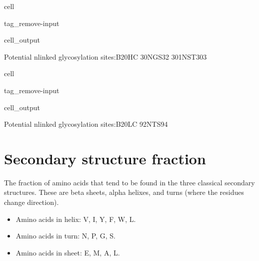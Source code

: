 \documentclass[letterpaper,10pt,english]{jupyterBook}
\begin{document}
\begin{sphinxuseclass}{cell}
\begin{sphinxuseclass}{tag_remove-input}\begin{sphinxVerbatimOutput}

\begin{sphinxuseclass}{cell_output}
\begin{sphinxVerbatim}[commandchars=\\\{\}]
Potential n\PYGZhy{}linked glycosylation sites:\PYGZhy{}\PYGZhy{}\PYGZhy{}\PYGZhy{}\PYGZhy{}\PYGZhy{}\PYGZhy{}\PYGZhy{}\PYGZhy{}\PYGZhy{}\PYGZhy{}\PYGZhy{}\PYGZhy{}\PYGZhy{}B20\PYGZus{}HC
30\PYGZhy{}NGS\PYGZhy{}32
301\PYGZhy{}NST\PYGZhy{}303
\end{sphinxVerbatim}

\end{sphinxuseclass}\end{sphinxVerbatimOutput}

\end{sphinxuseclass}
\end{sphinxuseclass}
\begin{sphinxuseclass}{cell}
\begin{sphinxuseclass}{tag_remove-input}\begin{sphinxVerbatimOutput}

\begin{sphinxuseclass}{cell_output}
\begin{sphinxVerbatim}[commandchars=\\\{\}]
Potential n\PYGZhy{}linked glycosylation sites:\PYGZhy{}\PYGZhy{}\PYGZhy{}\PYGZhy{}\PYGZhy{}\PYGZhy{}\PYGZhy{}\PYGZhy{}\PYGZhy{}\PYGZhy{}\PYGZhy{}\PYGZhy{}\PYGZhy{}\PYGZhy{}B20\PYGZus{}LC
92\PYGZhy{}NTS\PYGZhy{}94
\end{sphinxVerbatim}

\end{sphinxuseclass}\end{sphinxVerbatimOutput}

\end{sphinxuseclass}
\end{sphinxuseclass}

\section{Secondary structure fraction}
\label{\detokenize{ipynb/chapter1:secondary-structure-fraction}}
\sphinxAtStartPar
The fraction of amino acids that tend to be found in the three classical secondary structures. These are beta sheets, alpha helixes, and turns (where the residues change direction).
\begin{itemize}
\item {} 
\sphinxAtStartPar
Amino acids in helix: V, I, Y, F, W, L.

\item {} 
\sphinxAtStartPar
Amino acids in turn: N, P, G, S.

\item {} 
\sphinxAtStartPar
Amino acids in sheet: E, M, A, L.

\end{itemize}
\end{document}
